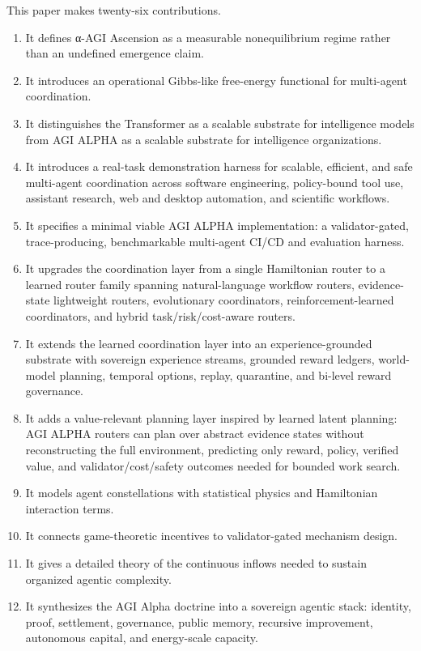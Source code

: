 \documentclass[11pt]{article}
\providecommand{\tightlist}{\setlength{\itemsep}{0pt}\setlength{\parskip}{0pt}}
\begin{document}
This paper makes twenty-six contributions.

\begin{enumerate}
\def\labelenumi{\arabic{enumi}.}
\tightlist
\item
  It defines α-AGI Ascension as a measurable nonequilibrium regime rather than an undefined emergence claim.
\item
  It introduces an operational Gibbs-like free-energy functional for multi-agent coordination.
\item
  It distinguishes the Transformer as a scalable substrate for intelligence models from AGI ALPHA as a scalable substrate for intelligence organizations.
\item
  It introduces a real-task demonstration harness for scalable, efficient, and safe multi-agent coordination across software engineering, policy-bound tool use, assistant research, web and desktop automation, and scientific workflows.
\item
  It specifies a minimal viable AGI ALPHA implementation: a validator-gated, trace-producing, benchmarkable multi-agent CI/CD and evaluation harness.
\item
  It upgrades the coordination layer from a single Hamiltonian router to a learned router family spanning natural-language workflow routers, evidence-state lightweight routers, evolutionary coordinators, reinforcement-learned coordinators, and hybrid task/risk/cost-aware routers.
\item
  It extends the learned coordination layer into an experience-grounded substrate with sovereign experience streams, grounded reward ledgers, world-model planning, temporal options, replay, quarantine, and bi-level reward governance.
\item
  It adds a value-relevant planning layer inspired by learned latent planning: AGI ALPHA routers can plan over abstract evidence states without reconstructing the full environment, predicting only reward, policy, verified value, and validator/cost/safety outcomes needed for bounded work search.
\item
  It models agent constellations with statistical physics and Hamiltonian interaction terms.
\item
  It connects game-theoretic incentives to validator-gated mechanism design.
\item
  It gives a detailed theory of the continuous inflows needed to sustain organized agentic complexity.
\item
  It synthesizes the AGI Alpha doctrine into a sovereign agentic stack: identity, proof, settlement, governance, public memory, recursive improvement, autonomous capital, and energy-scale capacity.

\end{enumerate}
\end{document}
